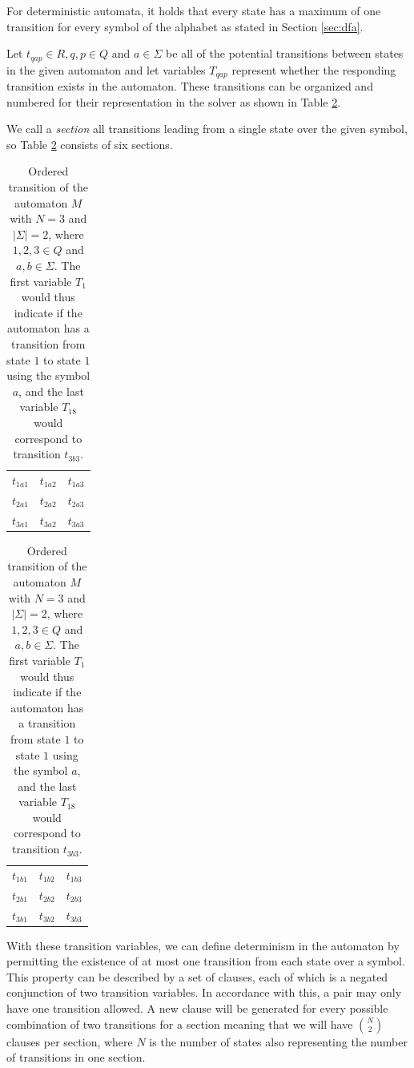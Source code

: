 For deterministic automata, it holds that every state has a maximum of one transition for every symbol of the alphabet as stated in Section \ref{sec:dfa}.

Let $t_{qap}\in R, q,p \in Q $ and $a \in \Sigma$ be all of the potential transitions between states in the given automaton and let variables $T_{qap}$ represent whether the responding transition exists in the automaton. These transitions can be organized and numbered for their representation in the solver as shown in Table \ref{tab:fsa32}.

We call a \textit{section} all transitions leading from a single state over the given symbol, so Table \ref{tab:fsa32} consists of six sections. 
\begin{table}[hb]
\centering
\label{tab:fsa32}
\caption{Ordered transition of the automaton $M$ with $N=3$ and $|\Sigma| = 2$, where $1,2,3 \in Q$ and $a,b \in \Sigma$. The first variable $T_1$ would thus indicate if the automaton has a transition from state $1$ to state $1$ using the symbol $a$, and the last variable $T_{18}$ would correspond to transition $t_{3b3}$.}
\vspace{0.3cm}
\begin{tabular}{ c c c }
 $t_{1a1}$ & $t_{1a2}$ & $t_{1a3}$ \\
 $t_{2a1}$ & $t_{2a2}$ & $t_{2a3}$ \\ 
 $t_{3a1}$ & $t_{3a2}$ & $t_{3a3}$
\end{tabular}
\hspace{1cm}
\begin{tabular}{ c c c }
 $t_{1b1}$ & $t_{1b2}$ & $t_{1b3}$ \\
 $t_{2b1}$ & $t_{2b2}$ & $t_{2b3}$ \\ 
 $t_{3b1}$ & $t_{3b2}$ & $t_{3b3}$
\end{tabular}
\end{table} 

With these transition variables, we can define determinism in the automaton by permitting the existence of at most one transition from each state over a symbol. This property can be described by a set of clauses, each of which is a negated conjunction of two transition variables. In accordance with this, a pair may only have one transition allowed. A new clause will be generated for every possible combination of two transitions for a section meaning that we will have $\binom{N}{2}$ clauses per section, where $N$ is the number of states also representing the number of transitions in one section.

